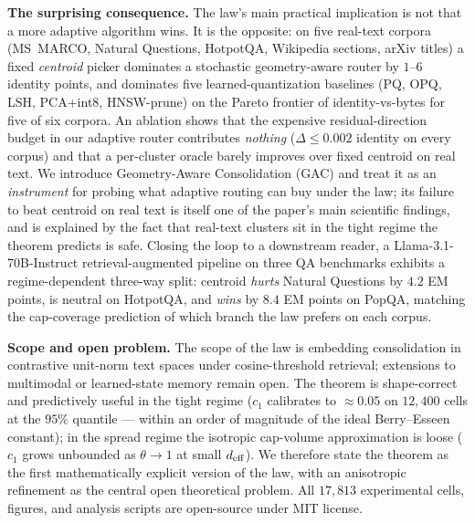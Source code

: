 \medskip
\noindent\textbf{The surprising consequence.} The law's main practical
implication is not that a more adaptive algorithm wins. It is the
opposite: on five real-text corpora (MS~MARCO, Natural Questions,
HotpotQA, Wikipedia sections, arXiv titles) a fixed \emph{centroid}
picker dominates a stochastic geometry-aware router by $1$--$6$
identity points, and dominates five learned-quantization baselines
(PQ, OPQ, LSH, PCA+int8, HNSW-prune) on the Pareto frontier of
identity-vs-bytes for five of six corpora. An ablation shows that the
expensive residual-direction budget in our adaptive router contributes
\emph{nothing} ($\Delta \leq 0.002$ identity on every corpus) and that
a per-cluster oracle barely improves over fixed centroid on real
text. We introduce Geometry-Aware Consolidation (GAC) and treat it as
an \emph{instrument} for probing what adaptive routing can buy under
the law; its failure to beat centroid on real text is itself one of
the paper's main scientific findings, and is explained by the fact
that real-text clusters sit in the tight regime the theorem predicts
is safe. Closing the loop to a downstream reader, a
Llama-3.1-70B-Instruct retrieval-augmented pipeline on three QA
benchmarks exhibits a regime-dependent three-way split: centroid
\emph{hurts} Natural Questions by $4.2$ EM points, is neutral on
HotpotQA, and \emph{wins} by $8.4$ EM points on PopQA, matching the
cap-coverage prediction of which branch the law prefers on each
corpus.

\medskip
\noindent\textbf{Scope and open problem.} The scope of the law is
embedding consolidation in contrastive unit-norm text spaces under
cosine-threshold retrieval; extensions to multimodal or learned-state
memory remain open. The theorem is shape-correct and predictively
useful in the tight regime ($c_1$ calibrates to $\approx 0.05$
on $12{,}400$ cells at the $95\%$ quantile --- within an order
of magnitude of the ideal Berry--Esseen constant); in the spread
regime the isotropic cap-volume approximation is loose ($c_1$
grows unbounded as $\theta \to 1$ at small ${d_{\mathrm{eff}}}$). We therefore state the theorem as the first
mathematically explicit version of the law, with an anisotropic
refinement as the central open theoretical problem. All $17{,}813$
experimental cells, figures, and analysis scripts are open-source
under MIT license.
